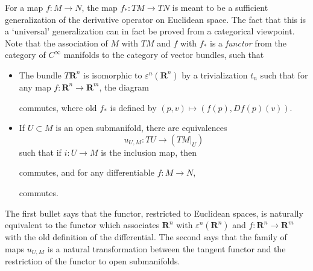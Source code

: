 For a map $f:M \to N$, the map $f_*: TM \to TN$ is meant to be a sufficient generalization of the derivative operator on Euclidean space. The fact that this is a `universal' generalization can in fact be proved from a categorical viewpoint. Note that the association of $M$ with $TM$ and $f$ with $f_*$ is a {\it functor} from the category of $C^\infty$ manifolds to the category of vector bundles, such that
%
\begin{itemize}
    \item The bundle $T\mathbf{R}^n$ is isomorphic to $\varepsilon^n(\mathbf{R}^n)$ by a trivialization $t_n$ such that for any map $f: \mathbf{R}^n \to \mathbf{R}^m$, the diagram
    \begin{center}
    \end{center}
    commutes, where $\text{old $f_*$}$ is defined by $(p,v) \mapsto (f(p), Df(p)(v))$.
    \item If $U \subset M$ is an open submanifold, there are equivalences
    \[ u_{U,M}: TU \to (TM|_U) \]
    such that if $i: U \to M$ is the inclusion map, then
    \begin{center}
    \end{center}
    commutes, and for any differentiable $f:M \to N$,
    \begin{center}
    \end{center}
    commutes.
\end{itemize}
%
The first bullet says that the functor, restricted to Euclidean spaces, is naturally equivalent to the functor which associates $\mathbf{R}^n$ with $\varepsilon^n(\mathbf{R}^n)$ and $f: \mathbf{R}^n \to \mathbf{R}^m$ with the old definition of the differential. The second says that the family of maps $u_{U,M}$ is a natural transformation between the tangent functor and the restriction of the functor to open submanifolds.

